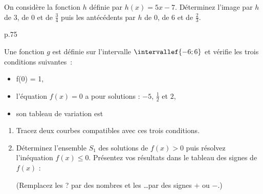 %
%
%
\begin{exr}
  On considère la fonction $h$ définie par $h(x)=5x-7$.\newline
  Déterminez l'image par $h$ de $3$, de $0$ et de $\frac{3}{4}$ puis les antécédents par $h$ de $0$, de $6$ et de $\frac{2}{3}$.
\end{exr}
%
%
%
%
%
%
\begin{exr}
   p.75
\end{exr}
%
%
%
\begin{exr}
  Une fonction $g$ est définie sur l'intervalle $\intervallef{-6;6}$ et vérifie les trois conditions suivantes~:
  
  \begin{minipage}[t]{.8\textwidth}
    \begin{itemize}
    \item f(0) = 1,
    \item  l'équation $f(x) = 0$ a pour solutions : $-5$, $\frac{1}{2}$ et $2$,
    \item son tableau de variation est 
      \begin{minipage}[c]{0.45\linewidth}
      \end{minipage}
    \end{itemize}
  \end{minipage}
  \begin{enumerate}
  \item Tracez deux courbes compatibles avec ces trois conditions.
  \item Déterminez l'ensemble $S_1$ des solutions de $f(x)>0$ puis résolvez l'inéquation  $f(x)\leqslant 0$.\newline
Présentez vos résultats dans le tableau des signes de $f(x)$ :

  {\centering

(Remplacez les \og ? \fg par des nombres et les \og \dots \fg par des signes $+$ ou $-$.)

}	
  \end{enumerate}
\end{exr}
